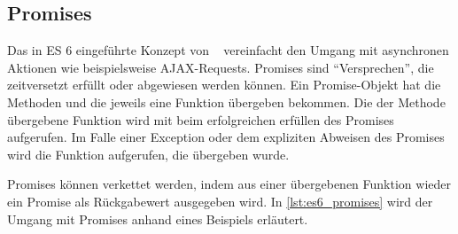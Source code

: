 \subsection{Promises}
\label{ssec:ge_promises}

Das in ES 6 eingeführte Konzept von ~\cite{promises}
vereinfacht den Umgang mit asynchronen Aktionen wie beispielsweise
AJAX-Requests.  Promises sind \enquote{Versprechen}, die zeitversetzt
erfüllt oder abgewiesen werden können.  Ein Promise-Objekt hat die
Methoden  und  die jeweils eine Funktion
übergeben bekommen.  Die der Methode  übergebene Funktion
wird mit beim erfolgreichen erfüllen des Promises aufgerufen.  Im Falle
einer Exception oder dem expliziten Abweisen des Promises wird die
Funktion aufgerufen, die  übergeben wurde.

Promises können verkettet werden, indem aus einer  übergebenen
Funktion wieder ein Promise als Rückgabewert ausgegeben wird.  In
\cref{lst:es6_promises} wird der Umgang mit Promises anhand eines Beispiels
erläutert.


